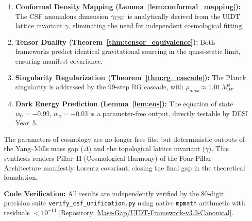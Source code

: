 \documentclass[12pt,a4paper,twoside]{article}
\theoremstyle{plain}
\theoremstyle{definition}
\theoremstyle{remark}
\newcommand{\UIDT}{\textsc{UIDT}}
\newcommand{\CSF}{\textsc{CSF}}
\begin{document}
\begin{enumerate}
    \item \textbf{Conformal Density Mapping (Lemma~\ref{lem:conformal_mapping}):}
    The \CSF{} anomalous dimension $\gamma_{\CSF}$ is analytically derived
    from the \UIDT{} lattice invariant $\gamma$, eliminating the need for
    independent cosmological fitting.

    \item \textbf{Tensor Duality (Theorem~\ref{thm:tensor_equivalence}):}
    Both frameworks predict identical gravitational sourcing in the
    quasi-static limit, ensuring manifest covariance.

    \item \textbf{Singularity Regularization (Theorem~\ref{thm:rg_cascade}):}
    The Planck singularity is addressed by the 99-step RG cascade, with
    $\rho_{max} \approx 1.01\,M_{Pl}^4$.

    \item \textbf{Dark Energy Prediction (Lemma~\ref{lem:eos}):}
    The equation of state $w_0 = -0.99$, $w_a = +0.03$ is a parameter-free
    output, directly testable by DESI Year~5.
\end{enumerate}

\noindent
The parameters of cosmology are no longer free fits, but deterministic
outputs of the Yang--Mills mass gap ($\Delta$) and the topological lattice
invariant ($\gamma$). This synthesis renders Pillar~II (Cosmological Harmony)
of the Four-Pillar Architecture manifestly Lorentz covariant, closing the
final gap in the theoretical foundation.

\vspace{1em}
\noindent
\textbf{Code Verification:} All results are independently verified by the
80-digit precision suite \texttt{verify\_csf\_unification.py} using native
\texttt{mpmath} arithmetic with residuals $< 10^{-14}$
[Repository: \href{https://github.com/Mass-Gap/UIDT-Framework-v3.9-Canonical}{Mass-Gap/UIDT-Framework-v3.9-Canonical}].
\end{document}
